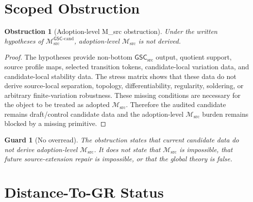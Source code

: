 \documentclass[11pt]{article}
\newcommand{\Msrc}{\mathcal{M}_{\mathrm{src}}}
\newcommand{\Mgsccand}{\mathcal{M}_{\mathrm{src}}^{\mathsf{GSC}\text{-}\mathrm{cand}}}
\newcommand{\GSC}{\mathsf{GSC}_{\mathrm{src}}}
\newtheorem{obstruction}{Obstruction}
\newtheorem{guard}{Guard}
\begin{document}
\section{Scoped Obstruction}

\begin{obstruction}[Adoption-level M\_src obstruction]
Under the written hypotheses of \(\Mgsccand\), adoption-level \(\Msrc\) is not
derived.
\end{obstruction}

\begin{proof}
The hypotheses provide non-bottom \(\GSC\) output, quotient support, source
profile maps, selected transition tokens, candidate-local variation data, and
candidate-local stability data. The stress matrix shows that these data do
not derive source-local separation, topology, differentiability, regularity,
soldering, or arbitrary finite-variation robustness. These missing conditions
are necessary for the object to be treated as adopted \(\Msrc\). Therefore
the audited candidate remains draft/control candidate data and the
adoption-level \(\Msrc\) burden remains blocked by a missing primitive.
\end{proof}

\begin{guard}[No overread]
The obstruction states that current candidate data do not derive
adoption-level \(\Msrc\). It does not state that \(\Msrc\) is impossible, that
future source-extension repair is impossible, or that the global theory is
false.
\end{guard}

\section{Distance-To-GR Status}
\end{document}

